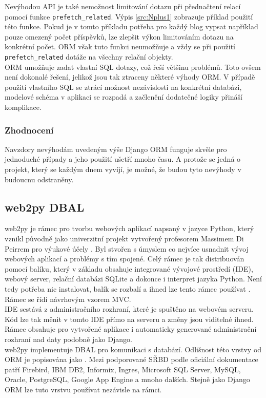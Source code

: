 \documentclass[ing,male,java,dept456]{diploma}						%
\begin{document}
Nevýhodou API je také nemožnost limitování dotazu při přednačtení relací pomocí funkce \lstinline[style=custompython]|prefetch_related|. Výpis \ref{src:Nplus1} zobrazuje příklad použití této funkce. Pokud je v tomto příkladu potřeba pro každý blog vypsat například pouze omezený počet příspěvků, lze zlepšit výkon limitováním dotazu na konkrétní počet. ORM však tuto funkci neumožňuje a vždy se při použití \lstinline[style=custompython]|prefetch_related| dotáže na všechny relační objekty. \\

ORM umožňuje zadat vlastní SQL dotazy, což řeší většinu problémů. Toto ovšem není dokonalé řešení, jelikož jsou tak ztraceny některé výhody ORM. V případě použití vlastního SQL se ztrácí možnost nezávislosti na konkrétní databázi, modelové schéma v aplikaci se rozpadá a začlenění dodatečné logiky přináší komplikace. \\

\subsubsection{Zhodnocení}
Navzdory nevýhodám uvedeným výše Django ORM funguje skvěle pro jednoduché případy a jeho použití ušetří mnoho času. A protože se jedná o projekt, který se každým dnem vyvíjí, je možné, že budou tyto nevýhody v budoucnu odstraněny.

\subsection{web2py DBAL}

web2py je rámec pro tvorbu webových aplikací napsaný v jazyce Python, který vznikl původně jako univerzitní projekt vytvořený profesorem Massimem Di Peirrem pro výukové účely \cite{wikiw2p}. Byl stvořen s úmyslem co nejvíce usnadnit vývoj webových aplikací a problémy s tím spojené. Celý rámec je tak distribuován pomocí balíku, který v základu obsahuje integrované vývojové prostředí (IDE), webový server, relační databázi SQLite a dokonce i interpret jazyka Python. Není tedy potřeba nic instalovat, balík se rozbalí a ihned lze tento rámec používat \cite{web2py}. Rámec se řídí návrhovým vzorem MVC. \\
IDE sestává z administračního rozhraní, které je spuštěno na webovém serveru. Kód lze tak měnit v tomto IDE přímo na serveru a změny jsou viditelné ihned. Rámec obsahuje pro vytvořené aplikace i automaticky generované administrační rozhraní nad daty podobně jako Django. \\
web2py implementuje DBAL pro komunikaci s databází. Odlišnost této vrstvy od ORM je popisována jako  \cite{wikiw2p}. Mezi podporované SŘBD podle oficiální dokumentace patří Firebird, IBM DB2, Informix, Ingres, Microsoft SQL Server, MySQL, Oracle, PostgreSQL, Google App Engine a mnoho dalších. Stejně jako Django ORM lze tuto vrstvu používat nezávisle na rámci.
\end{document}
